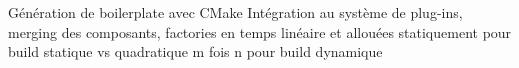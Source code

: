 
        	\begin{block}{Génération de boilerplate avec CMake}
        	Intégration au système de plug-ins, merging des composants, factories en temps linéaire et allouées statiquement pour build statique vs quadratique m fois n pour build dynamique
        	\end{block}